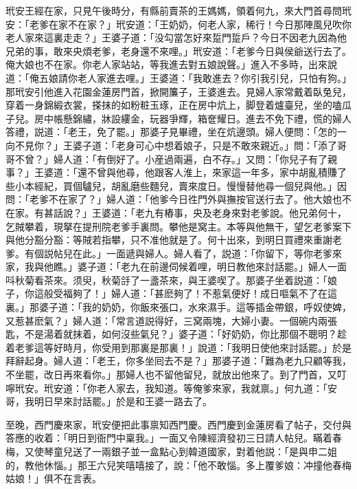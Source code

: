 玳安王經在家，只見午後時分，有縣前賣茶的王媽媽，領着何九，來大門首尋問玳安：「老爹在家不在家？」玳安道：「王奶奶，何老人家，稀行！今日那陣風兒吹你老人家來這裏走走？」王婆子道：「没勾當怎好來踅門踅戶？今日不因老九因為他兄弟的事，敢來央煩老爹，老身還不來哩。」玳安道：「老爹今日與侯爺送行去了。俺大娘也不在家。你老人家站站，等我進去對五娘說聲。」進入不多時，出來說道：「俺五娘請你老人家進去哩。」王婆道：「我敢進去？你引我引兒，只怕有狗。」那玳安引他進入花園金蓮房門首，掀開簾子，王婆進去。見婦人家常戴着臥兔兒，穿着一身錦緞衣裳，搽抹的如粉粧玉琢，正在房中炕上，脚登着爐臺兒，坐的嗑瓜子兒。房中帳懸錦繡，牀設縷金，玩器爭輝，箱奩耀日。進去不免下禮，慌的婦人答禮，説道：「老王，免了罷。」那婆子見畢禮，坐在炕邊頭。婦人便問：「怎的一向不見你？」王婆子道：「老身可心中想着娘子，只是不敢來親近。」問：「添了哥哥不曾？」婦人道：「有倒好了。小産過兩遍，白不存。」又問：「你兒子有了親事？」王婆道：「還不曾與他尋，他跟客人淮上，來家這一年多，家中胡亂積賺了些小本經紀，買個驢兒，胡亂磨些麵兒，賣來度日。慢慢替他尋一個兒與他。」因問：「老爹不在家了？」婦人道：「他爹今日徃門外與撫按官送行去了。他大娘也不在家。有甚話說？」王婆道：「老九有樁事，央及老身來對老爹說。他兄弟何十，乞賊攀着，現拏在提刑院老爹手裏問。攀他是窝主。本等與他無干，望乞老爹案下與他分豁分豁：等賊若指攀，只不准他就是了。何十出來，到明日買禮來重謝老爹。有個説帖兒在此。」一面遞與婦人。婦人看了，説道：「你留下，等你老爹來家，我與他瞧。」婆子道：「老九在前邊伺候着哩，明日教他來討話罷。」婦人一面呌秋菊看茶來。须臾，秋菊㧱了一盞茶來，與王婆喫了。那婆子坐着説道：「娘子，你這般受福夠了！」婦人道：「甚麽夠了！不惹氣便好！成日嘔氣不了在這裏。」那婆子道：「我的奶奶，你飯來張口，水來濕手。這等插金帶銀，呼奴使婢，又惹甚麽氣？」婦人道：「常言道説得好，三窝兩塊，大婦小妻。一個碗内兩張匙，不是湯着就抹着，如何沒些氣兒？」婆子道：「好奶奶，你比那個不聰明？趁着老爹這等好時月，你受用到那裏是那裏！」說道：「我明日使他來討話罷。」於是拜辭起身。婦人道：「老王，你多坐囘去不是？」那婆子道：「難為老九只顧等我，不坐罷，改日再來看你。」那婦人也不留他留兒，就放出他來了。到了門首，又叮嚀玳安。玳安道：「你老人家去，我知道。等俺爹來家，我就禀。」何九道：「安哥，我明日早來討話罷。」於是和王婆一路去了。

至晚，西門慶來家，玳安便把此事禀知西門慶。西門慶到金蓮房看了帖子，交付與答應的收着：「明日到衙門中稟我。」一面又令陳經濟發初三日請人帖兒。瞞着春梅，又使琴童兒送了一兩銀子並一盒點心到韓道國家，對着他説：「是與申二姐的，教他休惱。」那王六兒笑嘻嘻接了，說：「他不敢惱。多上覆爹娘：冲撞他春梅姑娘！」俱不在言表。

